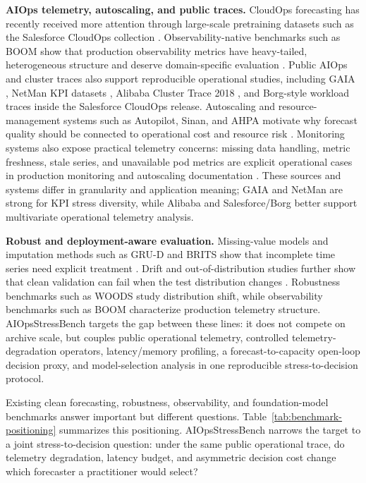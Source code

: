 \documentclass[conference]{IEEEtran}
\begin{document}
\noindent\textbf{AIOps telemetry, autoscaling, and public traces.}
CloudOps forecasting has recently received more attention through large-scale pretraining datasets such as the Salesforce CloudOps collection \cite{cloudops}. Observability-native benchmarks such as BOOM show that production observability metrics have heavy-tailed, heterogeneous structure and deserve domain-specific evaluation \cite{boom}. Public AIOps and cluster traces also support reproducible operational studies, including GAIA \cite{gaia}, NetMan KPI datasets \cite{netman}, Alibaba Cluster Trace 2018 \cite{alibaba}, and Borg-style workload traces inside the Salesforce CloudOps release. Autoscaling and resource-management systems such as Autopilot, Sinan, and AHPA motivate why forecast quality should be connected to operational cost and resource risk \cite{autopilot,sinan,ahpa}. Monitoring systems also expose practical telemetry concerns: missing data handling, metric freshness, stale series, and unavailable pod metrics are explicit operational cases in production monitoring and autoscaling documentation \cite{gcm_missing,gcm_latency,prom_staleness,k8s_hpa}. These sources and systems differ in granularity and application meaning; GAIA and NetMan are strong for KPI stress diversity, while Alibaba and Salesforce/Borg better support multivariate operational telemetry analysis.

\noindent\textbf{Robust and deployment-aware evaluation.}
Missing-value models and imputation methods such as GRU-D and BRITS show that incomplete time series need explicit treatment \cite{grud,brits}. Drift and out-of-distribution studies further show that clean validation can fail when the test distribution changes \cite{onenet,woods}. Robustness benchmarks such as WOODS study distribution shift, while observability benchmarks such as BOOM characterize production telemetry structure. AIOpsStressBench targets the gap between these lines: it does not compete on archive scale, but couples public operational telemetry, controlled telemetry-degradation operators, latency/memory profiling, a forecast-to-capacity open-loop decision proxy, and model-selection analysis in one reproducible stress-to-decision protocol.

Existing clean forecasting, robustness, observability, and foundation-model benchmarks answer important but different questions. Table~\ref{tab:benchmark-positioning} summarizes this positioning. AIOpsStressBench narrows the target to a joint stress-to-decision question: under the same public operational trace, do telemetry degradation, latency budget, and asymmetric decision cost change which forecaster a practitioner would select?
\end{document}
